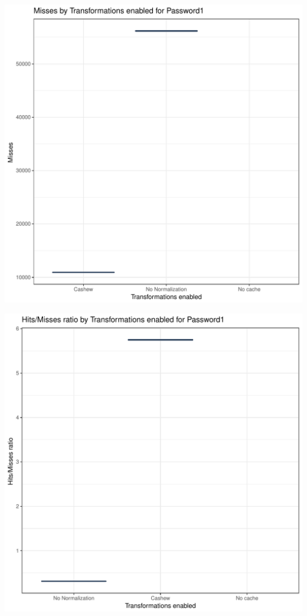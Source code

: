 \documentclass{article}\usepackage[]{graphicx}\usepackage[]{color}
\makeatletter
\def\maxwidth{ %
  \ifdim\Gin@nat@width>\linewidth
    \linewidth
  \else
    \Gin@nat@width
  \fi
}
\newenvironment{knitrout}{}{} %
\makeatother
\begin{document}
\begin{knitrout}
\includegraphics[width=\maxwidth]{figure/password-3} 

\includegraphics[width=\maxwidth]{figure/password-4} 

\end{knitrout}
\end{document}
